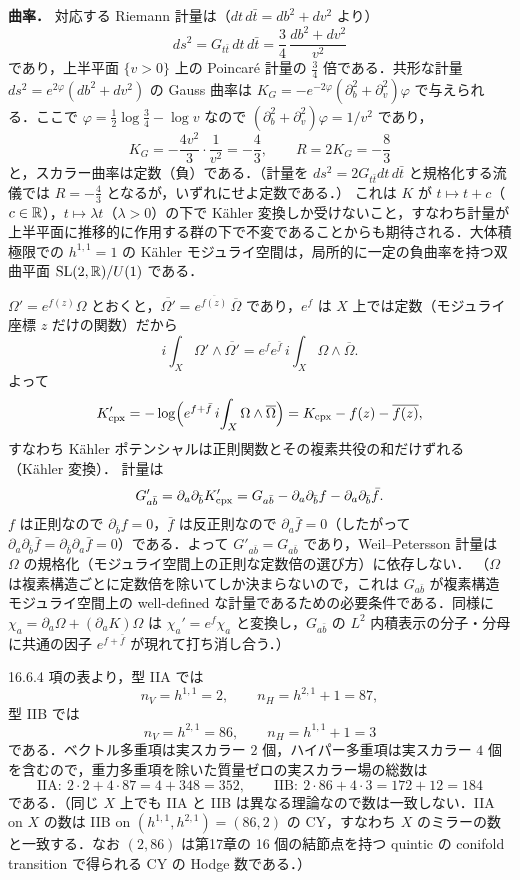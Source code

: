 \textbf{曲率．}
対応する Riemann 計量は（$dt\,d\bar t=db^2+dv^2$ より）
\[
ds^2=G_{t\bar t}\,dt\,d\bar t=\frac34\,\frac{db^2+dv^2}{v^2}
\]
であり，上半平面 $\{v>0\}$ 上の Poincar\'e 計量の $\tfrac34$ 倍である．共形な計量 $ds^2=e^{2\varphi}(db^2+dv^2)$ の Gauss 曲率は $K_G=-e^{-2\varphi}(\partial_b^2+\partial_v^2)\varphi$ で与えられる．ここで $\varphi=\tfrac12\log\tfrac34-\log v$ なので $(\partial_b^2+\partial_v^2)\varphi=1/v^2$ であり，
\[
K_G=-\frac{4v^2}{3}\cdot\frac1{v^2}=-\frac43,\qquad R=2K_G=-\frac83
\]
と，スカラー曲率は定数（負）である．（計量を $ds^2=2G_{t\bar t}dt\,d\bar t$ と規格化する流儀では $R=-\tfrac43$ となるが，いずれにせよ定数である．）
これは $K$ が $t\mapsto t+c$（$c\in\mathbb{R}$），$t\mapsto\lambda t$（$\lambda>0$）の下で K\"ahler 変換しか受けないこと，すなわち計量が上半平面に推移的に作用する群の下で不変であることからも期待される．大体積極限での $h^{1,1}=1$ の K\"ahler モジュライ空間は，局所的に一定の負曲率を持つ双曲平面 $\operatorname{SL}(2,\mathbb{R})/U(1)$ である．

$\Omega'=e^{f(z)}\Omega$ とおくと，$\overline{\Omega'}=e^{\overline{f(z)}}\,\overline\Omega$ であり，$e^{f}$ は $X$ 上では定数（モジュライ座標 $z$ だけの関数）だから
\[
i\int_X\Omega'\wedge\overline{\Omega'}=e^{f}e^{\bar f}\,i\int_X\Omega\wedge\overline\Omega .
\]
よって
\[
K'_{\rm cpx}=-\log\Bigl(e^{f+\bar f}\,i\!\int_X\Omega\wedge\overline\Omega\Bigr)=K_{\rm cpx}-f(z)-\overline{f(z)} ,
\]
すなわち K\"ahler ポテンシャルは正則関数とその複素共役の和だけずれる（K\"ahler 変換）．
計量は
\[
G'_{a\bar b}=\partial_a\partial_{\bar b}K'_{\rm cpx}=G_{a\bar b}-\partial_a\partial_{\bar b}f-\partial_a\partial_{\bar b}\bar f .
\]
$f$ は正則なので $\partial_{\bar b}f=0$，$\bar f$ は反正則なので $\partial_a\bar f=0$（したがって $\partial_a\partial_{\bar b}\bar f=\partial_{\bar b}\partial_a\bar f=0$）である．よって $G'_{a\bar b}=G_{a\bar b}$ であり，Weil--Petersson 計量は $\Omega$ の規格化（モジュライ空間上の正則な定数倍の選び方）に依存しない．
（$\Omega$ は複素構造ごとに定数倍を除いてしか決まらないので，これは $G_{a\bar b}$ が複素構造モジュライ空間上の well-defined な計量であるための必要条件である．同様に $\chi_a=\partial_a\Omega+(\partial_aK)\Omega$ は $\chi_a'=e^f\chi_a$ と変換し，$G_{a\bar b}$ の $L^2$ 内積表示の分子・分母に共通の因子 $e^{f+\bar f}$ が現れて打ち消し合う．）

16.6.4 項の表より，型 IIA では
\[
n_V=h^{1,1}=2,\qquad n_H=h^{2,1}+1=87,
\]
型 IIB では
\[
n_V=h^{2,1}=86,\qquad n_H=h^{1,1}+1=3
\]
である．ベクトル多重項は実スカラー $2$ 個，ハイパー多重項は実スカラー $4$ 個を含むので，重力多重項を除いた質量ゼロの実スカラー場の総数は
\[
\text{IIA}:\ 2\cdot2+4\cdot87=4+348=352,\qquad
\text{IIB}:\ 2\cdot86+4\cdot3=172+12=184
\]
である．（同じ $X$ 上でも IIA と IIB は異なる理論なので数は一致しない．IIA on $X$ の数は IIB on $(h^{1,1},h^{2,1})=(86,2)$ の CY，すなわち $X$ のミラーの数と一致する．なお $(2,86)$ は第17章の 16 個の結節点を持つ quintic の conifold transition で得られる CY の Hodge 数である．）

